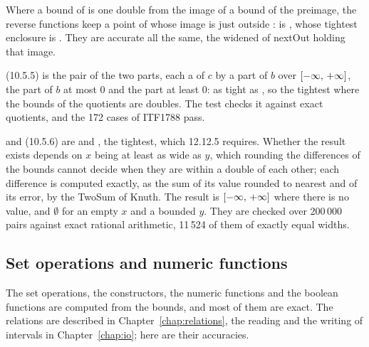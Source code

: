 \begin{Rem}\label{rem:accuracy-reverse-point}
Where a bound of  is one double from the image of a bound of the
preimage, the reverse functions keep a point of  whose image is
just outside :
 is
, whose tightest enclosure is . They
are accurate all the same, the widened  of nextOut holding that
image.
\end{Rem}

\medskip
{} (10.5.5) is the pair of the two parts, each a
 of $c$ by a part of $b$ over $[-\infty,\,+\infty]$, the
part of $b$ at most $0$ and the part at least $0$:\newinvfive{} as tight as
, so the tightest where the bounds of the quotients are
doubles. The test  checks it against exact
quotients, and the 172 cases of ITF1788 pass.

 and  (10.5.6) are
 and , the tightest,
which 12.12.5 requires. Whether the result exists depends on $x$ being at
least as wide as $y$, which rounding the differences of the bounds cannot
decide when they are within a double of each other; each difference is
computed exactly, as the sum of its value rounded to nearest and of its
error, by the TwoSum of Knuth. The result is $[-\infty,\,+\infty]$
where there is no value, and $\emptyset$ for an empty $x$ and a bounded
$y$. They are checked over 200\,000 pairs against exact rational
arithmetic, 11\,524 of them of exactly equal widths.\newinvfive

\subsection{Set operations and numeric functions}\label{sec:accuracy-set}

The set operations, the constructors, the numeric functions and the
boolean functions are computed from the bounds, and most of them are
exact. The relations are described in Chapter~\ref{chap:relations}, the
reading and the writing of intervals in Chapter~\ref{chap:io}; here are
their accuracies.

